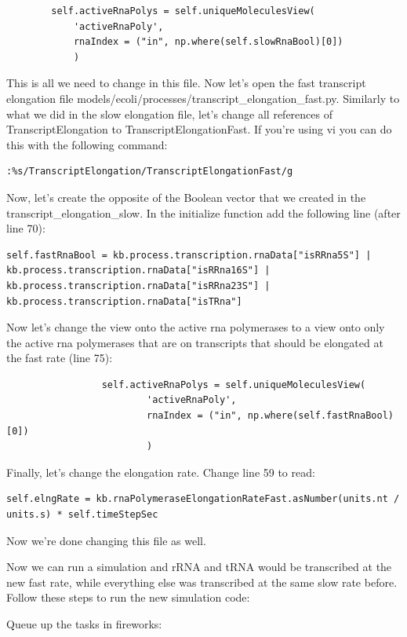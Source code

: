 \documentclass[12pt]{article}
\begin{document}
\begin{lstlisting}
		self.activeRnaPolys = self.uniqueMoleculesView(
			'activeRnaPoly',
			rnaIndex = ("in", np.where(self.slowRnaBool)[0])
			)
\end{lstlisting}

This is all we need to change in this file. Now let’s open the fast transcript elongation file models/ecoli/processes/transcript\_elongation\_fast.py. Similarly to what we did in the slow elongation file, let’s change all references of TranscriptElongation to TranscriptElongationFast. If you’re using vi you can do this with the following command:

\lstset{language=bash}
\begin{lstlisting}
:%s/TranscriptElongation/TranscriptElongationFast/g
\end{lstlisting}

Now, let’s create the opposite of the Boolean vector that we created in the transcript\_elongation\_slow. In the initialize function add the following line (after line 70):

\lstset{language=Python}
\begin{lstlisting}
self.fastRnaBool = kb.process.transcription.rnaData["isRRna5S"] | kb.process.transcription.rnaData["isRRna16S"] | kb.process.transcription.rnaData["isRRna23S"] | kb.process.transcription.rnaData["isTRna"]
\end{lstlisting}

Now let’s change the view onto the active rna polymerases to a view onto only the active rna polymerases that are on transcripts that should be elongated at the fast rate (line 75):

\begin{lstlisting}
                 self.activeRnaPolys = self.uniqueMoleculesView(
                         'activeRnaPoly',
                         rnaIndex = ("in", np.where(self.fastRnaBool)[0])
                         )
\end{lstlisting}

Finally, let’s change the elongation rate. Change line 59 to read:

\begin{lstlisting}
self.elngRate = kb.rnaPolymeraseElongationRateFast.asNumber(units.nt / units.s) * self.timeStepSec
\end{lstlisting}

Now we’re done changing this file as well.
\par
Now we can run a simulation and rRNA and tRNA would be transcribed at the new fast rate, while everything else was transcribed at the same slow rate before. Follow these steps to run the new simulation code:
\par
Queue up the tasks in fireworks:
\end{document}

